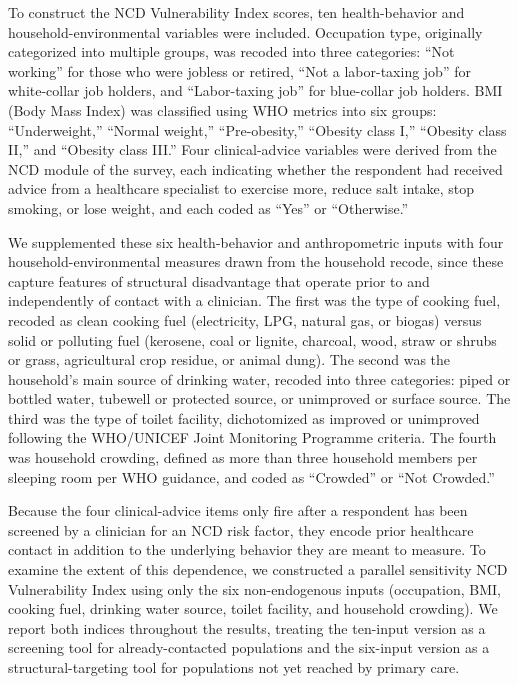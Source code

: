 \documentclass[
  12pt,
  a4paper]{article}
\begin{document}
To construct the NCD Vulnerability Index scores, ten health-behavior and household-environmental variables were included. Occupation type, originally categorized into multiple groups, was recoded into three categories: ``Not working'' for those who were jobless or retired, ``Not a labor-taxing job'' for white-collar job holders, and ``Labor-taxing job'' for blue-collar job holders. BMI (Body Mass Index) was classified using WHO metrics into six groups: ``Underweight,'' ``Normal weight,'' ``Pre-obesity,'' ``Obesity class I,'' ``Obesity class II,'' and ``Obesity class III.'' Four clinical-advice variables were derived from the NCD module of the survey, each indicating whether the respondent had received advice from a healthcare specialist to exercise more, reduce salt intake, stop smoking, or lose weight, and each coded as ``Yes'' or ``Otherwise.''

We supplemented these six health-behavior and anthropometric inputs with four household-environmental measures drawn from the household recode, since these capture features of structural disadvantage that operate prior to and independently of contact with a clinician. The first was the type of cooking fuel, recoded as clean cooking fuel (electricity, LPG, natural gas, or biogas) versus solid or polluting fuel (kerosene, coal or lignite, charcoal, wood, straw or shrubs or grass, agricultural crop residue, or animal dung). The second was the household's main source of drinking water, recoded into three categories: piped or bottled water, tubewell or protected source, or unimproved or surface source. The third was the type of toilet facility, dichotomized as improved or unimproved following the WHO/UNICEF Joint Monitoring Programme criteria. The fourth was household crowding, defined as more than three household members per sleeping room per WHO guidance, and coded as ``Crowded'' or ``Not Crowded.''

Because the four clinical-advice items only fire after a respondent has been screened by a clinician for an NCD risk factor, they encode prior healthcare contact in addition to the underlying behavior they are meant to measure. To examine the extent of this dependence, we constructed a parallel sensitivity NCD Vulnerability Index using only the six non-endogenous inputs (occupation, BMI, cooking fuel, drinking water source, toilet facility, and household crowding). We report both indices throughout the results, treating the ten-input version as a screening tool for already-contacted populations and the six-input version as a structural-targeting tool for populations not yet reached by primary care.
\end{document}
